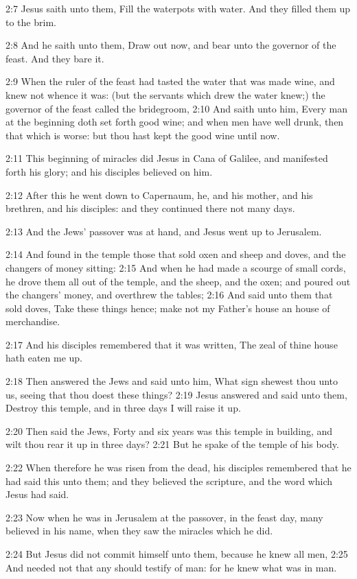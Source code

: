 2:7 Jesus saith unto them, Fill the waterpots with water. And they filled them up to the brim.

2:8 And he saith unto them, Draw out now, and bear unto the governor of the feast. And they bare it.

2:9 When the ruler of the feast had tasted the water that was made wine, and knew not whence it was: (but the servants which drew the water knew;) the governor of the feast called the bridegroom, 2:10 And saith unto him, Every man at the beginning doth set forth good wine; and when men have well drunk, then that which is worse: but thou hast kept the good wine until now.

2:11 This beginning of miracles did Jesus in Cana of Galilee, and manifested forth his glory; and his disciples believed on him.

2:12 After this he went down to Capernaum, he, and his mother, and his brethren, and his disciples: and they continued there not many days.

2:13 And the Jews' passover was at hand, and Jesus went up to Jerusalem.

2:14 And found in the temple those that sold oxen and sheep and doves, and the changers of money sitting: 2:15 And when he had made a scourge of small cords, he drove them all out of the temple, and the sheep, and the oxen; and poured out the changers' money, and overthrew the tables; 2:16 And said unto them that sold doves, Take these things hence; make not my Father's house an house of merchandise.

2:17 And his disciples remembered that it was written, The zeal of thine house hath eaten me up.

2:18 Then answered the Jews and said unto him, What sign shewest thou unto us, seeing that thou doest these things?  2:19 Jesus answered and said unto them, Destroy this temple, and in three days I will raise it up.

2:20 Then said the Jews, Forty and six years was this temple in building, and wilt thou rear it up in three days?  2:21 But he spake of the temple of his body.

2:22 When therefore he was risen from the dead, his disciples remembered that he had said this unto them; and they believed the scripture, and the word which Jesus had said.

2:23 Now when he was in Jerusalem at the passover, in the feast day, many believed in his name, when they saw the miracles which he did.

2:24 But Jesus did not commit himself unto them, because he knew all men, 2:25 And needed not that any should testify of man: for he knew what was in man.

